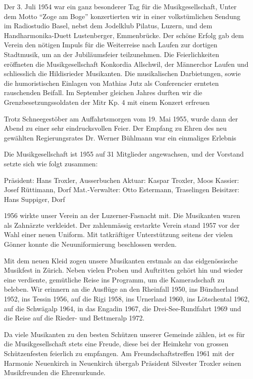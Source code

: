 \begin{multicols}{2}
    Der 3. Juli 1954 war ein ganz besonderer Tag für die Musikgesellschaft,
    Unter dem Motto "`Zoge am Boge"' konzertierten wir in einer volkstümlichen
    Sendung im Radiostudio Basel, nebst dem Jodelklub Pilatus, Luzern, und dem
    Handharmonika-Duett Lustenberger, Emmenbrücke. Der schöne Erfolg gab dem
    Verein den nötigen Impuls für die Weiterreise nach Laufen zur dortigen
    Stadtmusik, um an der Jubiläumsfeier teilzunehmen. Die Feierlichkeiten
    eröffneten die Musikgesellschaft Konkordia Allschwil, der Männerchor Laufen
    und schliesslich die Hildisrieder Musikanten. Die musikalischen
    Darbietungen, sowie die humoristischen Einlagen von Mathias Jutz als
    Conferencier ernteten rauschenden Beifall. Im September gleichen Jahres
    durften wir die Grenzbesetzungssoldaten der Mitr Kp. 4 mit einem Konzert
    erfreuen

    Trotz Schneegestöber am Auffahrtsmorgen vom 19. Mai 1955, wurde dann der
    Abend zu einer sehr eindrucksvollen Feier. Der Empfang zu Ehren des neu
    gewählten Regierungsrates Dr. Werner Bühlmann war ein einmaliges Erlebnis

    Die Musikgesellschaft ist 1955 auf 31 Mitglieder angewachsen, und der
    Vorstand setzte sich wie folgt zusammen:

    Präsident: Hans Troxler, Ausserbuchen Aktuar: Kaspar Troxler, Moos Kassier:
    Josef Rüttimann, Dorf Mat.-Verwalter: Otto Estermann, Traselingen Beisitzer:
    Hans Suppiger, Dorf

    1956 wirkte unser Verein an der Luzerner-Fasnacht mit. Die Musikanten waren
    als Zahnärzte verkleidet. Der zahlenmässig erstarkte Verein stand 1957 vor
    der Wahl einer neuen Uniform. Mit tatkräftiger Unterstützung seitens der
    vielen Gönner konnte die Neuuniformierung beschlossen werden.

    Mit dem neuen Kleid zogen unsere Musikanten erstmals an das eidgenössische
    Musikfest in Zürich. Neben vielen Proben und Auftritten gehört hin und
    wieder eine verdiente, gemütliche Reise ins Programm, um die Kameradschaft
    zu beleben. Wir erinnern an die Ausflüge an den Rheinfall 1950, ins
    Bündnerland 1952, ins Tessin 1956, auf die Rigi 1958, ins Urnerland 1960,
    ins Lötschental 1962, auf die Schwägalp 1964, in das Engadin 1967, die
    Drei-See-Rundfahrt 1969 und die Reise auf die Rieder- und Bettmeralp 1972.

    Da viele Musikanten zu den besten Schützen unserer Gemeinde zählen, ist es
    für die Musikgesellschaft stets eine Freude, diese bei der Heimkehr von
    grossen Schützenfesten feierlich zu empfangen. Am Freundschaftstreffen 1961
    mit der Harmonie Neuenkirch in Neuenkirch übergab Präsident Silvester
    Troxler seinen Musikfreunden die Ehrenurkunde.


\end{multicols}
